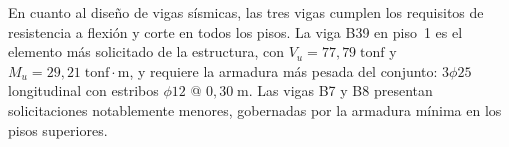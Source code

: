 En cuanto al diseño de vigas sísmicas, las tres vigas cumplen los requisitos de resistencia a flexión
y corte en todos los pisos. La viga B39 en piso~1 es el elemento más solicitado de la estructura,
con $V_u = 77{,}79\;\text{tonf}$ y $M_u = 29{,}21\;\text{tonf}{\cdot}\text{m}$, y requiere la
armadura más pesada del conjunto: $3\phi25$ longitudinal con estribos $\phi12$ @ $0{,}30\;\text{m}$.
Las vigas B7 y B8 presentan solicitaciones notablemente menores, gobernadas por la armadura mínima
en los pisos superiores.